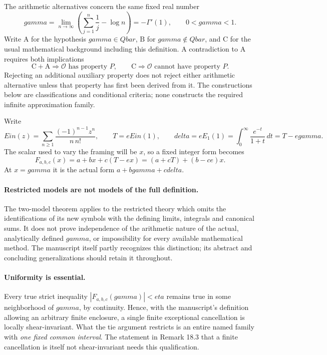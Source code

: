 \documentclass[11pt,a4paper]{article}
\newcommand{\QB}{\overline{\mathbb Q}}
\newcommand{\Qbar}{\overline{\mathbb Q}}
\DeclareMathOperator{\Ein}{Ein}
\theoremstyle{definition}
\theoremstyle{remark}
\theoremstyle{plain}
\numberwithin{equation}{section}
\def\Ein{Ein}\def\gamma{gamma}\def\delta{delta}\def\eta{eta}%
\def\Qbar{Qbar}\def\QB{Qbar}\def\mathbb#1{#1}%
\begin{document}
The arithmetic alternatives concern the same fixed real number
\[
 \gamma=\lim_{n\to\infty}\left(\sum_{j=1}^n\frac1j-\log n\right)
 =-\Gamma'(1),\qquad 0<\gamma<1.
\]
Write $\mathrm A$ for the hypothesis $\gamma\in\Qbar$, $\mathrm B$ for
$\gamma\notin\Qbar$, and $\mathrm C$ for the usual mathematical
background including this definition. A contradiction to $\mathrm A$
requires both implications
\[
 \mathrm C+\mathrm A\Longrightarrow\mathcal O\text{ has property }P,
 \qquad
 \mathrm C\Longrightarrow\mathcal O\text{ cannot have property }P.
\]
Rejecting an additional auxiliary property does not reject either
arithmetic alternative unless that property has first been derived from it.
The constructions below are classifications and conditional criteria;
none constructs the required infinite approximation family.

Write
\[
 \Ein(z)=\sum_{n\ge1}\frac{(-1)^{n-1}z^n}{n\,n!},\qquad
 T=e\Ein(1),\qquad \delta=eE_1(1)=\int_0^\infty\frac{e^{-t}}{1+t}\,dt=T-e\gamma.
\]
The scalar used to vary the framing will be $x$, so a fixed integer form becomes
\begin{equation}\label{ra:eq:affine}
 F_{a,b,c}(x)=a+bx+c(T-ex)=(a+cT)+(b-ce)x.
\end{equation}
At $x=\gamma$ it is the actual form $a+b\gamma+c\delta$.

\paragraph{Restricted models are not models of the full definition.}
The two-model theorem applies to the restricted theory which omits the identifications of its new symbols with the defining limits, integrals and canonical sums. It does not prove independence of the arithmetic nature of the actual, analytically defined $\gamma$, or impossibility for every available mathematical method. The manuscript itself partly recognizes this distinction; its abstract and concluding generalizations should retain it throughout.

\paragraph{Uniformity is essential.}
Every true strict inequality $|F_{a,b,c}(\gamma)|<\eta$ remains true in some neighborhood of $\gamma$, by continuity. Hence, with the manuscript's definition allowing an arbitrary finite enclosure, a single finite exceptional cancellation is locally shear-invariant. What the tie argument restricts is an entire named family with \emph{one fixed common interval}. The statement in Remark 18.3 that a finite cancellation is itself not shear-invariant needs this qualification.
\end{document}
